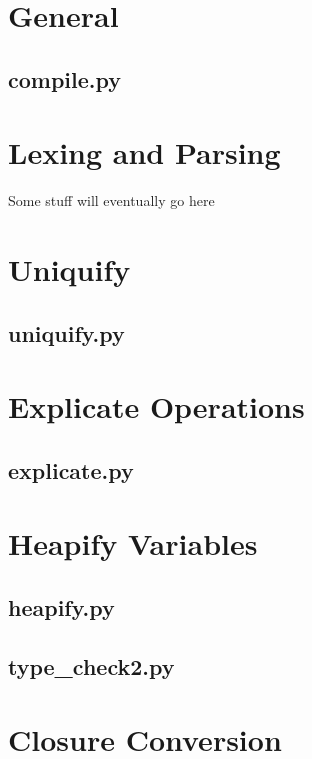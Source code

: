 \documentclass[letter,10pt]{article}
\title{}
\author{}
\date{}
\begin{document}
\section*{General}

\subsection{compile.py}


\clearpage
\section{Lexing and Parsing}
Some stuff will eventually go here

\clearpage
\section{Uniquify}

\subsection{uniquify.py}


\clearpage
\section{Explicate Operations}

\subsection{explicate.py}


\clearpage
\section{Heapify Variables}

\subsection{heapify.py}


\subsection{type\_check2.py}


\clearpage
\section{Closure Conversion}
\end{document}
